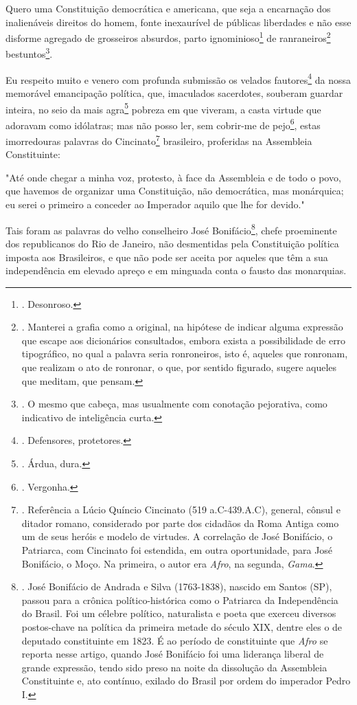 Quero uma Constituição democrática e americana, que seja a encarnação
dos inalienáveis direitos do homem, fonte inexaurível de públicas
liberdades e não esse disforme agregado de grosseiros absurdos, parto
ignominioso\footnote{. Desonroso.} de ranraneiros\footnote{. Manterei a
  grafia como a original, na hipótese de indicar alguma expressão que
  escape aos dicionários consultados, embora exista a possibilidade de
  erro tipográfico, no qual a palavra seria ronroneiros, isto é, aqueles
  que ronronam, que realizam o ato de ronronar, o que, por sentido
  figurado, sugere aqueles que meditam, que pensam.}
bestuntos\footnote{. O mesmo que cabeça, mas usualmente com conotação
  pejorativa, como indicativo de inteligência curta.}.

Eu respeito muito e venero com profunda submissão os velados
fautores\footnote{. Defensores, protetores.} da nossa memorável
emancipação política, que, imaculados sacerdotes, souberam guardar
inteira, no seio da mais agra\footnote{. Árdua, dura.} pobreza em que
viveram, a casta virtude que adoravam como idólatras; mas não posso ler,
sem cobrir-me de pejo\footnote{. Vergonha.}, estas imorredouras palavras
do Cincinato\footnote{. Referência a Lúcio Quíncio Cincinato (519
  a.C-439.A.C), general, cônsul e ditador romano, considerado por parte
  dos cidadãos da Roma Antiga como um de seus heróis e modelo de
  virtudes. A correlação de José Bonifácio, o Patriarca, com Cincinato
  foi estendida, em outra oportunidade, para José Bonifácio, o Moço. Na
  primeira, o autor era \emph{Afro}, na segunda, \emph{Gama}.}
brasileiro, proferidas na Assembleia Constituinte:

"Até onde chegar a minha voz, protesto, à face da Assembleia e de todo o
povo, que havemos de organizar uma Constituição, não democrática, mas
monárquica; eu serei o primeiro a conceder ao Imperador aquilo que lhe
for devido."

Tais foram as palavras do velho conselheiro José Bonifácio\footnote{.
  José Bonifácio de Andrada e Silva (1763-1838), nascido em Santos (SP),
  passou para a crônica político-histórica como o Patriarca da
  Independência do Brasil. Foi um célebre político, naturalista e poeta
  que exerceu diversos postos-chave na política da primeira metade do
  século XIX, dentre eles o de deputado constituinte em 1823. É ao
  período de constituinte que \emph{Afro} se reporta nesse artigo,
  quando José Bonifácio foi uma liderança liberal de grande expressão,
  tendo sido preso na noite da dissolução da Assembleia Constituinte e,
  ato contínuo, exilado do Brasil por ordem do imperador Pedro I.},
chefe proeminente dos republicanos do Rio de Janeiro, não desmentidas
pela Constituição política imposta aos Brasileiros, e que não pode ser
aceita por aqueles que têm a sua independência em elevado apreço e em
minguada conta o fausto das monarquias.

